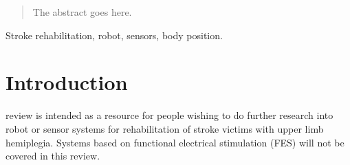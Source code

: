 \documentclass[journal]{IEEEtran}
\begin{document}







\maketitle


\begin{abstract}
The abstract goes here.
\end{abstract}

\begin{IEEEkeywords}
Stroke rehabilitation, robot, sensors, body position. %
\end{IEEEkeywords}






%



\section{Introduction}
% 
% 
% 
% 
 review is intended as a resource for people wishing 
to do further research into robot or sensor systems for rehabilitation of 
stroke victims with upper limb hemiplegia. Systems based on functional electrical 
stimulation (FES) will not be covered in this review.
 
\end{document}
